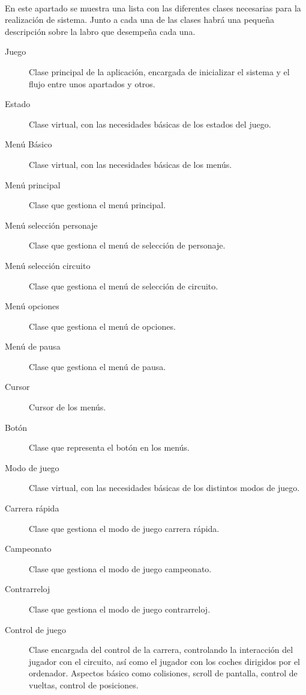 \paragraph{}
En este apartado se muestra una lista con las diferentes clases necesarias para la realización de sistema. Junto a cada una de
las clases habrá una pequeña descripción sobre la labro que desempeña cada una.

\begin{description}
    \item [Juego] Clase principal de la aplicación, encargada de inicializar el sistema y el flujo entre unos apartados y otros.
    \item [Estado] Clase virtual, con las necesidades básicas de los estados del juego.
    
    \item [Menú Básico] Clase virtual, con las necesidades básicas de los menús.
    \item [Menú principal] Clase que gestiona el menú principal.
    \item [Menú selección personaje] Clase que gestiona el menú de selección de personaje.
    \item [Menú selección circuito] Clase que gestiona el menú de selección de circuito.
    \item [Menú opciones] Clase que gestiona el menú de opciones.
    \item [Menú de pausa] Clase que gestiona el menú de pausa.
    \item [Cursor] Cursor de los menús.
    \item [Botón] Clase que representa el botón en los menús.
    
    \item [Modo de juego] Clase virtual, con las necesidades básicas de los distintos modos de juego.
    \item [Carrera rápida] Clase que gestiona el modo de juego carrera rápida.
    \item [Campeonato] Clase que gestiona el modo de juego campeonato.
    \item [Contrarreloj] Clase que gestiona el modo de juego contrarreloj.
    
    \item [Control de juego] Clase encargada del control de la carrera, controlando la interacción del jugador con el circuito, así 
    como el jugador con los coches dirigidos por el ordenador. Aspectos básico como colisiones, scroll de pantalla, 
    control de vueltas, control
    de posiciones.
    

\end{description}
